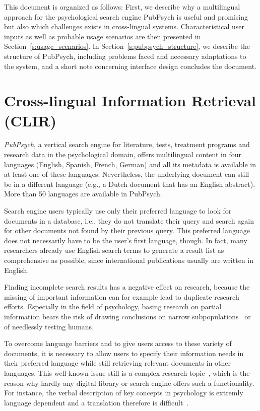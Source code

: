 \documentclass[a4paper,11pt]{article}
\begin{document}
This document is organized as follows: First, we describe why a multilingual approach for the psychological search engine PubPsych is useful and promising but also which challenges exists in cross-lingual systems. Characteristical user inputs as well as probable usage scenarios are then presented in Section~\ref{s:usage_scenarios}. In Section~\ref{s:pubpsych_structure}, we describe the structure of PubPsych, including problems faced and necessary adaptations to the system, and a short note concerning interface design concludes the document.


\section{Cross-lingual Information Retrieval (CLIR)}
\label{s:clir}
\textit{PubPsych}, a vertical search engine for literature, tests, treatment programs and research data in the psychological domain, offers multilingual content in four languages (English, Spanish, French, German) and all its metadata is available in at least one of these languages. Nevertheless, the underlying document can still be in a different language (e.g., a Dutch document that has an English abstract). More than 50 languages are available in PubPsych.

Search engine users typically use only their preferred language to look for documents in a database, i.e., they do not translate their query and search again for other documents not found by their previous query. This preferred language does not necessarily have to be the user's first language, though. In fact, many researchers already use English search terms to generate a result list as comprehensive as possible, since international publications usually are written in English. 

Finding incomplete search results has a negative effect on research, because the missing of important information can for example lead to duplicate research efforts. Especially in the field of psychology, basing research on partial information bears the risk of drawing conclusions on narrow subpopulations~\cite{henrichEtal:2010} or of needlessly testing humans.

To overcome language barriers and to give users access to these variety of documents, it is necessary to allow users to specify their information needs in their preferred language while still retrieving relevant documents in other languages. This well-known issue still is a complex research topic~\cite{diekema:2012}, which is the reason why hardly any digital library or search engine offers such a functionality. For instance, the verbal description of key concepts in psychology is extremly language dependent and a translation therefore is difficult~\cite{kornadt:1994}. %
\end{document}
